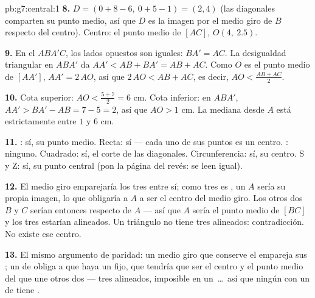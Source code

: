 \begin{solution}{pb:g7:central:1}
\textbf{8.} $D = (0 + 8 - 6,\ 0 + 5 - 1) = (2, 4)$ (las
diagonales comparten su punto medio, así que $D$ es la imagen por el medio giro de
$B$ respecto del centro). Centro: el punto medio de $[AC]$,
$O(4,\ 2.5)$.

\textbf{9.} En el  $ABA'C$, los lados opuestos son
iguales: $BA' = AC$. La desigualdad triangular en $ABA'$ da
$AA' < AB + BA' = AB + AC$. Como $O$ es el punto medio de
$[AA']$, $AA' = 2\,AO$, así que $2\,AO < AB + AC$, es decir,
$AO < \frac{AB + AC}{2}$.

\textbf{10.} Cota superior: $AO < \frac{5 + 7}{2} = 6$ cm. Cota
inferior: en $ABA'$, $AA' > BA' - AB = 7 - 5 = 2$, así que
$AO > 1$ cm. La mediana desde $A$ está estrictamente entre $1$ y
$6$ cm.

\textbf{11.} : sí, su punto medio. Recta: sí --- cada uno
de sus puntos es un centro. : ninguno. Cuadrado:
sí, el corte de las diagonales. Circunferencia: sí, su centro.
S y Z: sí, su punto central (pon la página del revés:
se leen igual).

\textbf{12.} El medio giro emparejaría los tres  entre
sí; como tres es , un  $A$ sería su propia
imagen, lo que obligaría a $A$ a ser el centro del medio giro. Los otros
dos  $B$ y $C$ serían entonces  respecto de $A$ ---
así que $A$ sería el punto medio de $[BC]$ y los tres
 estarían alineados. Un triángulo no tiene tres  alineados:
contradicción. No existe ese centro.

\textbf{13.} El mismo argumento de paridad: un medio giro que conserve
el  empareja sus ; un  de 
obliga a que haya un  fijo, que tendría que ser el centro y el punto medio
del  que une otros dos  --- tres  alineados,
imposible en un \,\dots\ así que ningún  con un
 de  tiene .


\end{solution}
